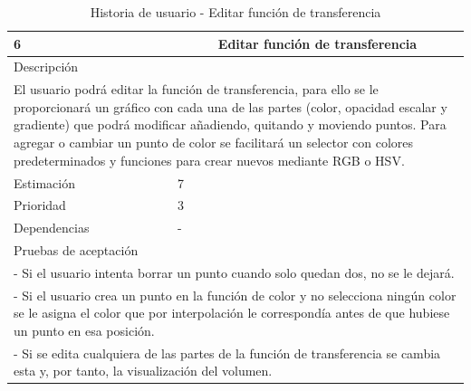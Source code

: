 \begin{table}[H]
	\begin{center}
		\begin{tabular} {|l|c|l|}
			\hline
			6 & \multicolumn{2}{c|}{Editar función de transferencia} \\ \hline \hline
			\multicolumn{3}{|l|}{Descripción} \\ \hline
			\multicolumn{3}{|p{12cm}|}{El usuario podrá editar la función de transferencia, para ello se le proporcionará un gráfico con cada una de las partes (color, opacidad escalar y gradiente) que podrá modificar añadiendo, quitando y moviendo puntos. Para agregar o cambiar un punto de color se facilitará un selector con colores predeterminados y funciones para crear nuevos mediante RGB o HSV.} \\ \hline
			\multicolumn{2}{|l|}{Estimación} & 7 \\ \hline
			\multicolumn{2}{|l|}{Prioridad} & 3 \\ \hline
			\multicolumn{2}{|l|}{Dependencias} & - \\ \hline
			\multicolumn{3}{|l|}{Pruebas de aceptación} \\ \hline
			\multicolumn{3}{|p{12cm}|}{ - Si el usuario intenta borrar un punto cuando solo quedan dos, no se le dejará.} \\
			\multicolumn{3}{|p{12cm}|}{ - Si el usuario crea un punto en la función de color y no selecciona ningún color se le asigna el color que por interpolación le correspondía antes de que hubiese un punto en esa posición.} \\
			\multicolumn{3}{|p{12cm}|}{ - Si se edita cualquiera de las partes de la función de transferencia se cambia esta y, por tanto, la visualización del volumen.} \\ \hline
		\end{tabular}
	\end{center}
	\caption{Historia de usuario - Editar función de transferencia}
	\label{tab:hu_editar_funcion_de_transferencia}
\end{table}

